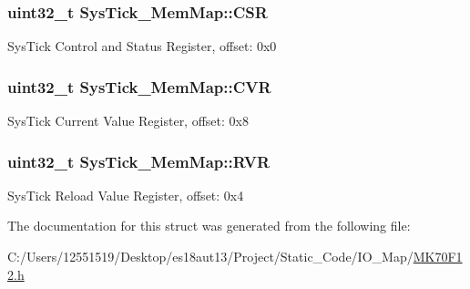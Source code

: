 \subsubsection[{C\+S\+R}]{\setlength{\rightskip}{0pt plus 5cm}uint32\+\_\+t Sys\+Tick\+\_\+\+Mem\+Map\+::\+C\+S\+R}\label{struct_sys_tick___mem_map_aec23689880afd46876916055403e867a}
Sys\+Tick Control and Status Register, offset\+: 0x0 \hypertarget{struct_sys_tick___mem_map_a508dd628bc347f199e7baf4b1bfbfa0d}{}
\subsubsection[{C\+V\+R}]{\setlength{\rightskip}{0pt plus 5cm}uint32\+\_\+t Sys\+Tick\+\_\+\+Mem\+Map\+::\+C\+V\+R}\label{struct_sys_tick___mem_map_a508dd628bc347f199e7baf4b1bfbfa0d}
Sys\+Tick Current Value Register, offset\+: 0x8 \hypertarget{struct_sys_tick___mem_map_a3f2018b492fd4bc1d141a718d499e50f}{}
\subsubsection[{R\+V\+R}]{\setlength{\rightskip}{0pt plus 5cm}uint32\+\_\+t Sys\+Tick\+\_\+\+Mem\+Map\+::\+R\+V\+R}\label{struct_sys_tick___mem_map_a3f2018b492fd4bc1d141a718d499e50f}
Sys\+Tick Reload Value Register, offset\+: 0x4 

The documentation for this struct was generated from the following file\+:\begin{DoxyCompactItemize}
\item 
C\+:/\+Users/12551519/\+Desktop/es18aut13/\+Project/\+Static\+\_\+\+Code/\+I\+O\+\_\+\+Map/\hyperlink{_m_k70_f12_8h}{M\+K70\+F12.\+h}\end{DoxyCompactItemize}
